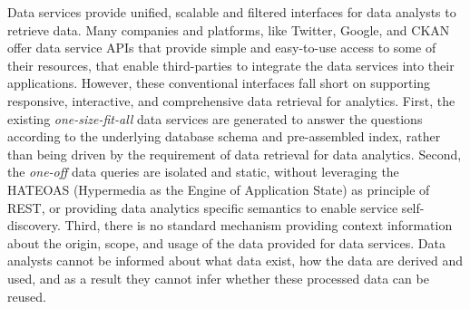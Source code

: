 \documentclass[10pt, conference, compsocconf]{IEEEtran}
\begin{document}




Data services provide unified, scalable and filtered interfaces for data analysts to retrieve data\cite{borkar2006xml}. Many companies and platforms, like Twitter, Google, and CKAN\cite{CKAN} offer data service APIs that provide simple and easy-to-use access to some of their resources, that enable third-parties to integrate the data services into their applications. However, these conventional interfaces fall short on supporting responsive, interactive, and comprehensive data retrieval for analytics. First, the existing \textit{one-size-fit-all} data services are generated to answer the questions according to the underlying database schema and pre-assembled index, rather than being driven by the requirement of data retrieval for data analytics\cite{dillon2013towards}. Second, the \textit{one-off} data queries are isolated and static, without leveraging the HATEOAS (Hypermedia as the Engine of Application State) as principle of REST, or providing data analytics specific semantics to enable service self-discovery. Third, there is no standard mechanism providing context information about the origin, scope, and usage of the data provided for data services. Data analysts cannot be informed about what data exist, how the data are derived and used, and as a result they cannot infer whether these processed data can be reused. 
\end{document}
